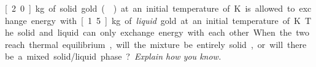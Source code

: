 \label{FNT1.2.1-8}

\unit[2.0]{kg} of solid gold () at an initial temperature of \unit[1000]{K} is allowed to exchange energy with \unit[1.5]{kg} of {\em liquid} gold at an initial temperature of \unit[1336]{K}. The solid and liquid can only exchange energy with each other. When the two reach thermal equilibrium, will the mixture be entirely solid, or will there be a mixed solid/liquid phase? {\em Explain how you know.}
